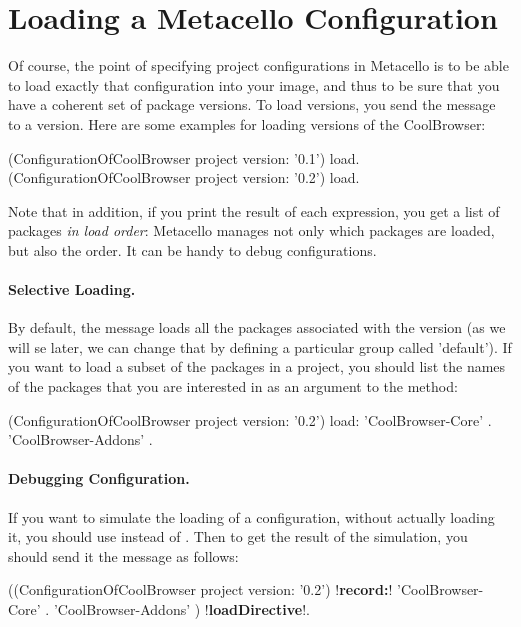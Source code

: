 \documentclass[a4paper,10pt,twoside]{book}
\begin{document}
\section{Loading a Metacello Configuration}
Of course, the point of specifying project configurations in Metacello is to be able to load exactly that configuration into your image, and thus to be sure that you have a coherent set of package versions. 
To load versions, you send the message  to a version. Here are some examples for loading versions of the CoolBrowser: 

\begin{code}{}
  (ConfigurationOfCoolBrowser project version: '0.1') load.
  (ConfigurationOfCoolBrowser project version: '0.2') load.
\end{code}

Note that in addition, if you print the result of each expression, you get a list of packages \emph{in load order}: Metacello manages not only which packages are loaded, but also the order. It can be handy to debug configurations.

\paragraph{Selective Loading.} By default, the  message loads all the packages associated with the version (as we will se later, we can change that by defining a particular group called 'default'). If you want to load a subset of the packages in a project, you should list 
the names of the packages that you are interested in as an argument to the  method:

\begin{code}{}
  (ConfigurationOfCoolBrowser project version: '0.2') load: 
  		{ 'CoolBrowser-Core' . 
  		'CoolBrowser-Addons' }.
\end{code}


\paragraph{Debugging Configuration.}
If you want to simulate the loading of a configuration, without actually loading it, you should use  instead of . Then to get the result of the simulation, you should send it the message  as follows:

\begin{code}{}
  ((ConfigurationOfCoolBrowser project version: '0.2') !\textbf{record:}! 
  		{ 'CoolBrowser-Core' .
		'CoolBrowser-Addons' }) !\textbf{loadDirective}!.
\end{code} 
\end{document}
